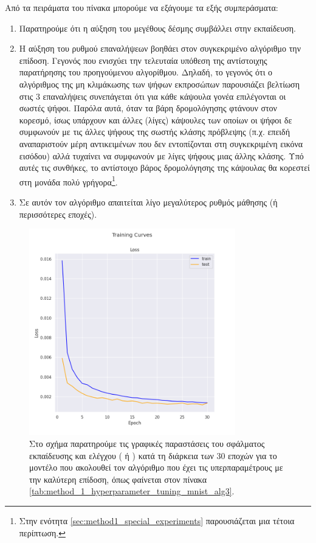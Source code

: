 Από τα πειράματα του πίνακα μπορούμε να εξάγουμε τα εξής συμπεράσματα:
\begin{enumerate}
    \item Παρατηρούμε ότι η αύξηση του μεγέθους δέσμης συμβάλλει στην εκπαίδευση.
    \item Η αύξηση του ρυθμού επαναλήψεων βοηθάει στον συγκεκριμένο αλγόριθμο την επίδοση. Γεγονός που ενισχύει την τελευταία υπόθεση της αντίστοιχης παρατήρησης του προηγούμενου αλγορίθμου. Δηλαδή, το γεγονός ότι ο αλγόριθμος της μη κλιμάκωσης των ψήφων εκπροσώπων παρουσιάζει βελτίωση στις 3 επαναλήψεις συνεπάγεται ότι για κάθε κάψουλα γονέα επιλέγονται οι σωστές ψήφοι. Παρόλα αυτά, όταν τα βάρη δρομολόγησης φτάνουν στον κορεσμό, ίσως υπάρχουν και άλλες (λίγες) κάψουλες των οποίων οι ψήφοι δε συμφωνούν με τις άλλες ψήφους της σωστής κλάσης πρόβλεψης (π.χ. επειδή αναπαριστούν μέρη αντικειμένων που δεν εντοπίζονται στη συγκεκριμένη εικόνα εισόδου) αλλά τυχαίνει να συμφωνούν με λίγες ψήφους μιας άλλης κλάσης. Υπό αυτές τις συνθήκες, το αντίστοιχο βάρος δρομολόγησης της κάψουλας θα κορεστεί στη μονάδα πολύ γρήγορα\footnote{Στην ενότητα \ref{sec:method1_special_experiments} παρουσιάζεται μια τέτοια περίπτωση.}. 
    \item Σε αυτόν τον αλγόριθμο απαιτείται λίγο μεγαλύτερος ρυθμός μάθησης (ή περισσότερες εποχές).
\end{enumerate}
\begin{figure}[h]
    \centering
    \includegraphics[width=0.8\textwidth]{images/chapter experiments/method 1/image 3/train_curve.png}
    \caption{Στο σχήμα παρατηρούμε τις γραφικές παραστάσεις του σφάλματος εκπαίδευσης και ελέγχου ( ή ) κατά τη διάρκεια των 30 εποχών για το μοντέλο που ακολουθεί τον αλγόριθμο  που έχει τις υπερπαραμέτρους με την καλύτερη επίδοση, όπως φαίνεται στον πίνακα \ref{tab:method_1_hyperparameter_tuning_mnist_alg3}.}
    \label{fig:exp_method_1_mnist_alg3}
  \end{figure}
